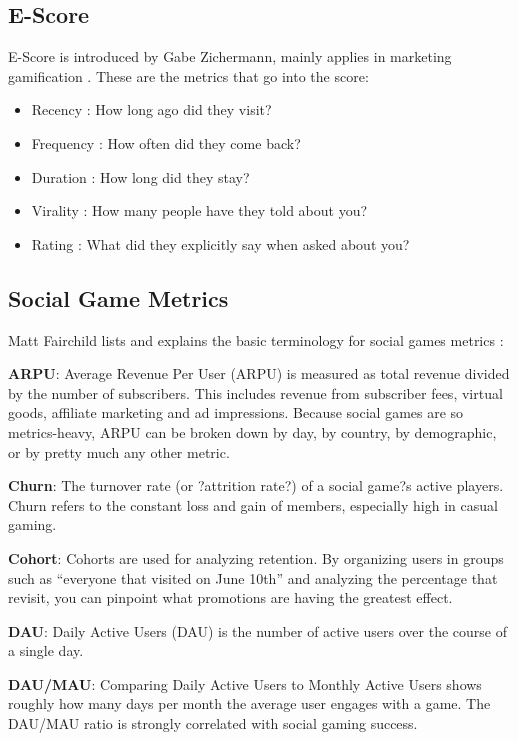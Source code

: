 \subsection {E-Score}
E-Score is introduced by Gabe Zichermann, mainly applies in marketing gamification \cite {Petersen2011}. 
These are the metrics that go into the score:  
\begin{itemize}
  \item Recency : How long ago did they visit?  
  \item Frequency : How often did they come back? 
  \item Duration : How long did they stay? 
  \item Virality : How many people have they told about you? 
  \item Rating : What did they explicitly say when asked about you? 
\end{itemize}

\subsection{Social Game Metrics}

Matt Fairchild lists and explains the basic terminology for social games metrics \cite {Fairchild2010}:

\textbf{ARPU}: Average Revenue Per User (ARPU) is measured as total revenue divided by the number of subscribers. This includes revenue from subscriber fees, virtual goods, affiliate marketing and ad impressions. Because social games are so metrics-heavy, ARPU can be broken down by day, by country, by demographic, or by pretty much any other metric.

\textbf{Churn}: The turnover rate (or ?attrition rate?) of a social game?s active players. Churn refers to the constant loss and gain of members, especially high in casual gaming.

\textbf{Cohort}: Cohorts are used for analyzing retention. By organizing users in groups such as ``everyone that visited on June 10th'' and analyzing the percentage that revisit, you can pinpoint what promotions are having the greatest effect.

\textbf{DAU}: Daily Active Users (DAU) is the number of active users over the course of a single day.

\textbf{DAU/MAU}: Comparing Daily Active Users to Monthly Active Users shows roughly how many days per month the average user engages with a game. The DAU/MAU ratio is strongly correlated with social gaming success.

